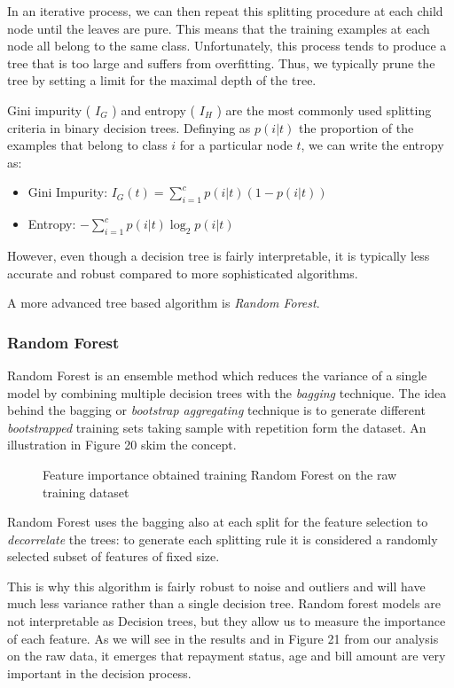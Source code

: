 \documentclass{article}
\begin{document}
In an iterative process, we can then repeat this splitting procedure at each child node until the leaves are pure. This means that the training examples at each node all belong to the same class. Unfortunately, this process tends to produce a tree that is too large and suffers from overfitting. Thus, we typically prune the tree by setting a limit for the maximal depth of the tree.

Gini impurity ( $I_{G}$ ) and entropy ( $I_{H}$ ) are the most commonly used splitting criteria in binary decision trees. Definying as $p(i|t)$ the proportion of the examples that belong to class $i$ for a particular node $t$, we can write the entropy as:

\begin{itemize}
    \item Gini Impurity: $I_{G}(t) = \sum_{i=1}^{c}p(i|t)(1-p(i|t))$
    \item Entropy: $-\sum_{i=1}^{c}p(i|t)\log_{2}p(i|t)$
\end{itemize}
However, even though a decision tree is fairly interpretable, it is typically less accurate and robust compared to more sophisticated algorithms.

A more advanced tree based algorithm is \emph{Random Forest}.

\subsubsection{Random Forest}
Random Forest is an ensemble method which reduces the variance of a single model by combining multiple decision trees with the \emph{bagging} technique. The idea behind the bagging or \emph{bootstrap aggregating} technique is to generate different \emph{bootstrapped} training sets taking sample with repetition form the dataset. An illustration in Figure 20 skim the concept.

\begin{figure}[h]
\centering

\caption{Feature importance obtained training Random Forest on the raw training dataset}
\end{figure}

Random Forest uses the bagging also at each split for the feature selection to \emph{decorrelate} the trees: to generate each splitting rule it is considered a randomly selected subset of features of fixed size.

This is why this algorithm is fairly robust to noise and outliers and will have much less variance rather than a single decision tree. Random forest models are not interpretable as Decision trees, but they allow us to measure the importance of each feature. As we will see in the results and in Figure 21 from our analysis on the raw data, it emerges that repayment status, age and bill amount are very important in the decision process.
\end{document}
